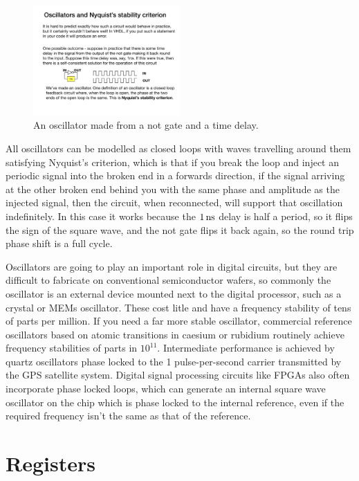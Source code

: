 \documentclass[../physical_computing.tex]{subfiles}
\begin{document}
\begin{figure}[htbp]
    \centering
    \includegraphics[width=0.5\textwidth]
    {chapter_3/figures/oscillator_logic.pdf}
    \caption{An oscillator made from a not gate and a time delay.}
    \label{fig:oscillator_logic}
\end{figure}

All oscillators can be modelled as closed loops with waves travelling around them satisfying Nyquist's criterion, which is that if you break the loop and inject an periodic signal into the broken end in a
forwards direction, if the signal arriving at the other broken end behind you with the same phase and amplitude as the injected signal, then the circuit, when reconnected, will support that oscillation indefinitely. In this case it works because the $\rm 1\,ns$ delay is half a period, so it flips the sign of the square wave, and the not
gate flips it back again, so the round trip phase shift is a full
cycle.

Oscillators are going to play an important role in digital circuits, 
but they are difficult to fabricate on conventional semiconductor
wafers, so commonly the oscillator is an external device mounted
next to the digital processor, such as a crystal or MEMs oscillator. These cost litle and have a frequency stability of tens of
parts per million. If you need a far more stable oscillator,
commercial reference oscillators based on atomic transitions in
caesium or rubidium routinely achieve frequency stabilities of
parts in $10^{11}$. Intermediate performance is achieved by
quartz oscillators phase locked to the 1 pulse-per-second 
carrier transmitted by the GPS satellite system. Digital signal
processing circuits like FPGAs also often incorporate phase locked
loops, which can generate an internal square wave oscillator on the
chip which is phase locked to the internal reference, even if the 
required frequency isn't the same as that of the reference. 

\section{Registers}
\label{sec:registers}
\end{document}
